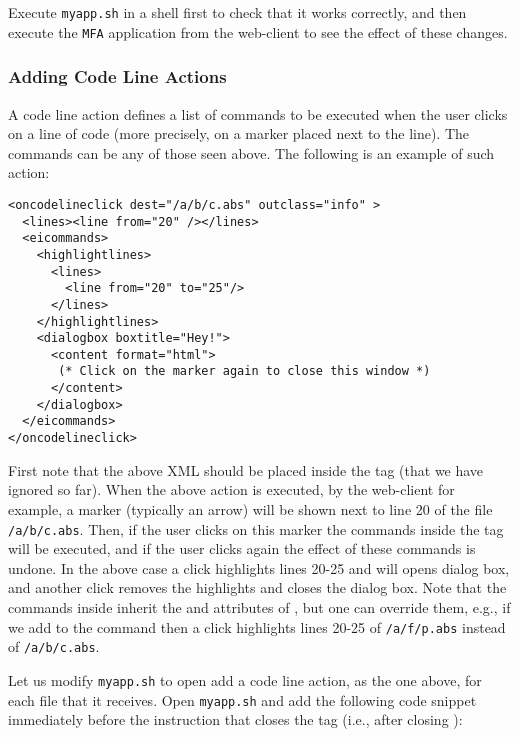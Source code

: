 \medskip
\noindent
Execute \texttt{myapp.sh} in a shell first to check that it works
correctly, and then execute the \texttt{MFA} application from the
web-client to see the effect of these changes.


\subsubsection{Adding Code Line Actions}

A code line action defines a list of commands to be executed when the
user clicks on a line of code (more precisely, on a marker placed next
to the line). The commands can be any of those seen above. The
following is an example of such action:

\medskip
\begin{lstlisting}
<oncodelineclick dest="/a/b/c.abs" outclass="info" >
  <lines><line from="20" /></lines>
  <eicommands>
    <highlightlines>
      <lines>
        <line from="20" to="25"/>
      </lines>
    </highlightlines>
    <dialogbox boxtitle="Hey!"> 
      <content format="html">
       (* Click on the marker again to close this window *)
      </content>
    </dialogbox>
  </eicommands>
</oncodelineclick>
\end{lstlisting}

\medskip
\noindent
First note that the above XML should be placed inside the
 tag (that we have ignored so far).
%
When the above action is executed, by the web-client for example, a
marker (typically an arrow) will be shown next to line 20 of the file
\texttt{/a/b/c.abs}.
%
Then, if the user clicks on this marker the commands inside the
 tag will be executed, and if the user clicks again
the effect of these commands is undone.
%
In the above case a click highlights lines 20-25 and will opens dialog
box, and another click removes the highlights and closes the dialog
box.
%
Note that the commands inside  inherit the 
and  attributes of , but one can
override them, e.g., if we add  to the
 command then a click highlights lines 20-25 of
\texttt{/a/f/p.abs} instead of \texttt{/a/b/c.abs}.
%

Let us modify \texttt{myapp.sh} to open add a code line action, as the
one above, for each file that it receives. Open \texttt{myapp.sh} and
add the following code snippet immediately before the instruction that
closes the  tag (i.e., after closing ):


